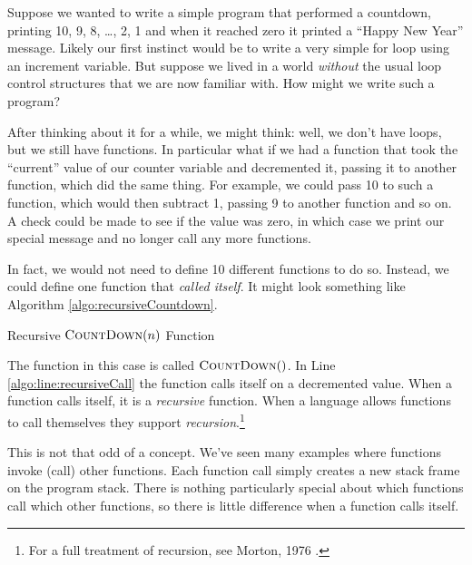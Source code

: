 

Suppose we wanted to write a simple program that performed a 
countdown, printing
10, 9, 8, \ldots, 2, 1 and when it reached zero it printed a ``Happy
New Year'' message.  Likely our first instinct would be to write a 
very simple for loop using an increment variable.  But suppose
we lived in a world \emph{without} the usual loop control structures 
that we are now
familiar with.  How might we write such a program?

After thinking about it for a while, we might think: well, we don't have
loops, but we still have functions.  In particular what if we had a function
that took the ``current'' value of our counter variable and decremented it, 
passing it to another function, which did the same thing.  For example, we 
could pass 10 to such a function, which would then subtract 1, passing 9
to another function and so on.  A check could be made to see if the value was 
zero, in which case we print our special message and no longer call any more 
functions.

In fact, we would not need to define 10 different functions to do so.  Instead, 
we could define one function that \emph{called itself}.  It might look something
like Algorithm \ref{algo:recursiveCountdown}.

\begin{algorithm}[H]
 
\caption{Recursive $\textsc{CountDown}(n)$ Function}
\label{algo:recursiveCountdown}
\end{algorithm}

The function in this case is called $\textsc{CountDown}()$.  In Line 
\ref{algo:line:recursiveCall} the function calls itself on a decremented
value.  When a function calls itself, it is a \emph{recursive} function.
When a language allows functions to call themselves they support 
\emph{recursion}.\footnote{For a full treatment of recursion, see
Morton, 1976 \cite{MORTON1976}.}

This is not that odd of a concept.  We've seen many examples where 
functions invoke (call) other functions.  Each function call simply 
creates a new stack frame on the program stack.  There is nothing 
particularly special about which functions call which other functions, 
so there is little difference when a function calls itself. 

